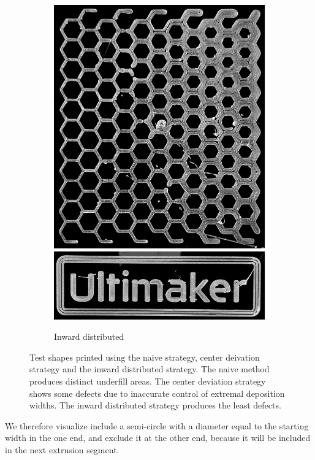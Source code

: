 \begin{figure}
\begin{subfigure}{\figwidth}
\includegraphics[height=\figheight]{sources/applications/P3_print_hex_inward_edited.png}
\includegraphics[width=\figwidth]{sources/applications/P3_print_UM_inward_edited.png}
\caption{Inward distributed}\label{print_inward}
\end{subfigure}
\caption{
Test shapes printed using the naive strategy, center deivation strategy and the inward distributed strategy.
The naive method produces distinct underfill areas.
The center deviation strategy shows some defects due to inaccurate control of extremal deposition widths.
The inward distributed strategy produces the least defects.
}
\label{prints}
\end{figure}

We therefore visualize include a semi-circle with a diameter equal to the starting width in the one end, and exclude it at the other end, because it will be included in the next extrusion segment.

